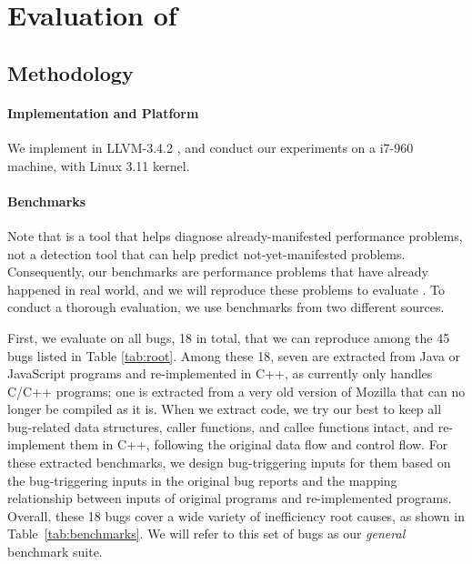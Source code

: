 \section{Evaluation of \Tool}
\label{sec:experiment}

\subsection{Methodology}
\label{sec:result_meth}



\paragraph{Implementation and Platform}
We implement \Tool in LLVM-3.4.2 \cite{llvm}, and conduct our
experiments on a i7-960 machine, with Linux 3.11 kernel. 

\paragraph{Benchmarks}
Note that \Tool is a tool that helps diagnose already-manifested performance problems,
not a detection tool that can help predict not-yet-manifested
problems. Consequently, our benchmarks are performance problems that have already
happened in real world, and we will reproduce these problems to evaluate \Tool.
To conduct a thorough evaluation, we use
benchmarks from two different sources.

First, we evaluate \Tool on all bugs, 18 in total, that we can reproduce 
among the 45 bugs listed in Table \ref{tab:root}. 
Among these 18, seven are extracted from Java or JavaScript
programs and re-implemented in C++, as \Tool currently only handles C/C++
programs; one is extracted from a very old version of Mozilla that can no longer be
compiled as it is.
When we extract code, we try our best to keep all bug-related data structures,
caller functions, and callee functions intact, and re-implement them in C++, 
following the original data flow and control flow. For these extracted benchmarks, 
we design bug-triggering inputs for them based on the bug-triggering inputs in 
the original bug reports and the mapping relationship between inputs of original programs 
and re-implemented programs.
Overall, these 18 bugs cover a wide variety of inefficiency root causes, as 
shown in Table~\ref{tab:benchmarks}. 
We will refer to this set of bugs as our \emph{general} benchmark suite.

